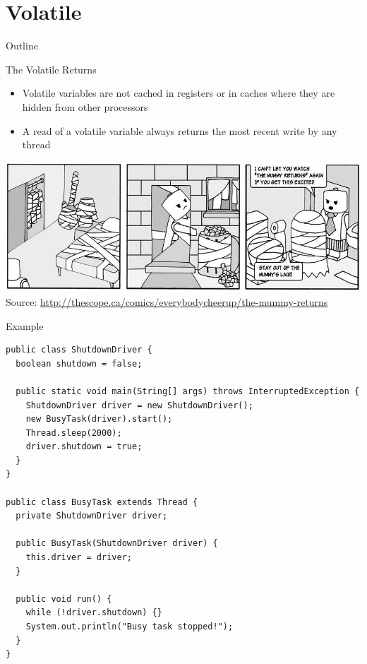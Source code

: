 \section{Volatile}

\begin{frame}{Outline}
  \tableofcontents[current]
\end{frame}

\begin{frame}{The Volatile Returns}
  \begin{itemize}
  \item Volatile variables are not cached in registers or in
    caches where they are hidden from other processors
  \item A read of a volatile variable always returns the most recent
    write by any thread
  \end{itemize}

  
  \begin{center}
    \includegraphics[width=\textwidth]{figures/the-mummy-returns} \\
    \tiny{Source: \url{http://thescope.ca/comics/everybodycheerup/the-mummy-returns}}
  \end{center}
\end{frame}

\begin{frame}[fragile]{Example}
\begin{lstlisting}[basicstyle=\fontsize{7}{9}\selectfont\ttfamily]
public class ShutdownDriver {
  boolean shutdown = false;

  public static void main(String[] args) throws InterruptedException {
    ShutdownDriver driver = new ShutdownDriver();
    new BusyTask(driver).start();
    Thread.sleep(2000);
    driver.shutdown = true;
  }
}

public class BusyTask extends Thread {
  private ShutdownDriver driver;

  public BusyTask(ShutdownDriver driver) {
    this.driver = driver;
  }

  public void run() {
    while (!driver.shutdown) {}
    System.out.println("Busy task stopped!");
  }
}
\end{lstlisting}
\end{frame}

